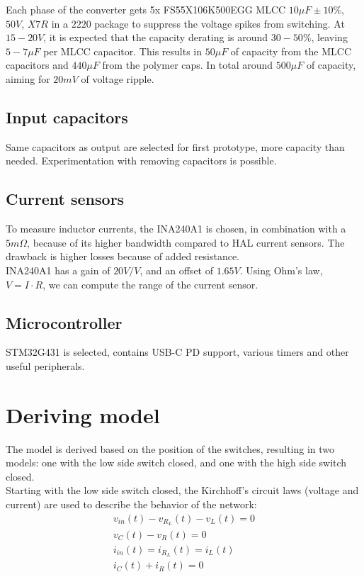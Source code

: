 \documentclass[]{article}
\begin{document}
\noindent Each phase of the converter gets 5x FS55X106K500EGG MLCC $10 \mu F \pm 10 \%$, $50V$, $X7R$ in a $2220$ package to suppress the voltage spikes from switching. At $15-20V$, it is expected that the capacity derating is around $30-50 \%$, leaving $5-7 \mu F$ per MLCC capacitor. This results in $50 \mu F$ of capacity from the MLCC capacitors and $440 \mu F$ from the polymer caps. In total around $500 \mu F$ of capacity, aiming for $20mV$ of voltage ripple.  

\subsection{Input capacitors}
Same capacitors as output are selected for first prototype, more capacity than needed. Experimentation with removing capacitors is possible.  


\subsection{Current sensors}
To measure inductor currents, the INA240A1 is chosen, in combination with a $5m \Omega$, because of its higher bandwidth compared to HAL current sensors. The drawback is higher losses because of added resistance. \\

INA240A1 has a gain of $20V/V$, and an offset of $1.65V$. Using Ohm's law, $V = I \cdot R$, we can compute the range of the current sensor. 

\subsection{Microcontroller}
STM32G431 is selected, contains USB-C PD support, various timers and other useful peripherals. 



\newpage
\section{Deriving model}
The model is derived based on the position of the switches, resulting in two models: one with the low side switch closed, and one with the high side switch closed. \\

Starting with the low side switch closed, the Kirchhoff's circuit laws (voltage and current) are used to describe the behavior of the network: \\
\begin{equation}
	\begin{array}{l}
		v_{in}(t) - v_{R_{L}}(t) - v_{L}(t) = 0 \\
		v_{C}(t) - v_{R}(t) = 0 \\
		i_{in}(t) = i_{R_{L}}(t) = i_{L}(t) \\
		i_{C}(t) + i_{R}(t) = 0
	\end{array}
\end{equation}
\end{document}
